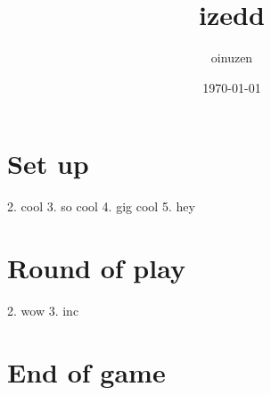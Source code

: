 \documentclass{article}%
\title{izedd}%
\author{oinuzen}%
\date{\today}%
\begin{document}
%
\pagestyle{empty}%
\normalsize%
\maketitle%
\section{ Set up
}%
\label{sec:Setup}%
%
2. cool
%
3. so cool
%
4. gig cool
%
5. hey


%
\section{ Round of play
}%
\label{sec:Roundofplay}%
%
2. wow
%
3. inc


%
\section{ End of game}%
\label{sec:Endofgame}%

%
\end{document}
